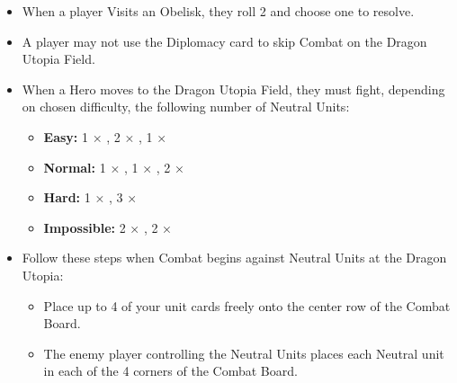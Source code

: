 \begin{multicols*}{2}
\begin{itemize}
  \item When a player Visits an Obelisk, they roll 2  and choose one to resolve.
  \item A player may not use the Diplomacy card to skip Combat on the Dragon Utopia Field.
  \item When a Hero moves to the Dragon Utopia Field, they must fight, depending on chosen difficulty, the following number of Neutral Units:
  \begin{itemize}
    \item \textbf{Easy:} 1 × , 2 × , 1 × 
    \item \textbf{Normal:} 1 × , 1 × , 2 × 
    \item \textbf{Hard:} 1 × , 3 × 
    \item \textbf{Impossible:}  2 × , 2 × 
  \end{itemize}
  \item Follow these steps when Combat begins against Neutral Units at the Dragon Utopia:
  \begin{itemize}
    \item Place up to 4 of your unit cards freely onto the center row of the Combat Board.
    \item The enemy player controlling the Neutral Units places each Neutral unit in each of the 4 corners of the Combat Board.
  \end{itemize}
\end{itemize}


\end{multicols*}
